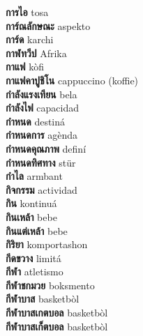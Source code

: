 \textbf{ การไอ  } tosa \\
\textbf{ การ์ณลักษณะ  } aspekto \\
\textbf{ การ์ด  } karchi \\
\textbf{ กาฬทวีป  } Afrika \\
\textbf{ กาแฟ  } kòfi \\
\textbf{ กาแฟคาปูชิโน  } cappuccino (koffie) \\
\textbf{ กำลังแรงเทียน  } bela \\
\textbf{ กำลังไฟ  } capacidad \\
\textbf{ กำหนด  } destiná \\
\textbf{ กำหนดการ  } agènda \\
\textbf{ กำหนดคุณภาพ  } definí \\
\textbf{ กำหนดทิศทาง  } stür \\
\textbf{ กำไล  } armbant \\
\textbf{ กิจกรรม  } actividad \\
\textbf{ กิน  } kontinuá \\
\textbf{ กินเหล้า  } bebe \\
\textbf{ กินแต่เหล้า  } bebe \\
\textbf{ กิริยา  } komportashon \\
\textbf{ กีดขวาง  } limitá \\
\textbf{ กีฬา  } atletismo \\
\textbf{ กีฬาชกมวย  } boksmento \\
\textbf{ กีฬาบาส  } basketbòl \\
\textbf{ กีฬาบาสเกตบอล  } basketbòl \\
\textbf{ กีฬาบาสเก็ตบอล  } basketbòl \\
